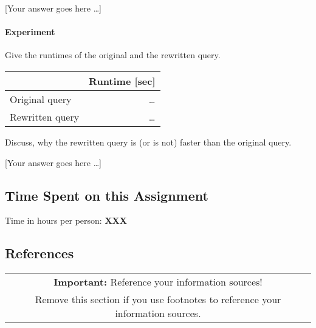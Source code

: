 \documentclass[11pt]{scrartcl}
\newcommand{\youranswerhere}{[Your answer goes here \ldots]}
\begin{document}
\youranswerhere{}

\paragraph{Experiment}

Give the runtimes of the original and the rewritten query.

\begin{table}[H]
  \centering
  \begin{tabular}{l|r}
    & Runtime [sec] \tabularnewline
    \hline
    Original query  & \ldots \tabularnewline
    Rewritten query & \ldots \tabularnewline
  \end{tabular}
\end{table}

Discuss, why the rewritten query is (or is not) faster than the original query.

\youranswerhere{}

\subsection*{Time Spent on this Assignment}

Time in hours per person: \textbf{XXX}

\subsection*{References}

\begin{table}[H]
  \centering
  \begin{tabular}{c}
    \hline
    \textbf{Important:} Reference your information sources! \tabularnewline
    Remove this section if you use footnotes to reference your information sources. \tabularnewline
    \hline
  \end{tabular}
\end{table}
\end{document}

